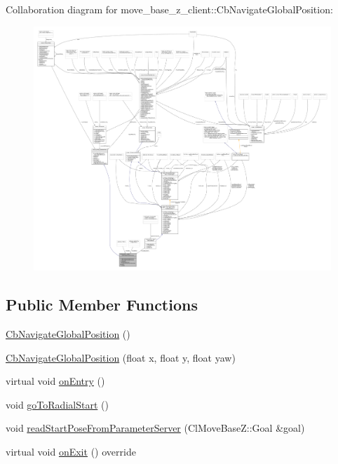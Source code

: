 Collaboration diagram for move\+\_\+base\+\_\+z\+\_\+client\+:\+:Cb\+Navigate\+Global\+Position\+:
\nopagebreak
\begin{figure}[H]
\begin{center}
\leavevmode
\includegraphics[width=350pt]{classmove__base__z__client_1_1CbNavigateGlobalPosition__coll__graph}
\end{center}
\end{figure}
\subsection*{Public Member Functions}
\begin{DoxyCompactItemize}
\item 
\hyperlink{classmove__base__z__client_1_1CbNavigateGlobalPosition_a3aec938912c0df9798bb18d5bb86c628}{Cb\+Navigate\+Global\+Position} ()
\item 
\hyperlink{classmove__base__z__client_1_1CbNavigateGlobalPosition_a4270b60a6d8ea39810ef1133f4e2cae4}{Cb\+Navigate\+Global\+Position} (float x, float y, float yaw)
\item 
virtual void \hyperlink{classmove__base__z__client_1_1CbNavigateGlobalPosition_aa91be9e16bb3b67560e97c8d29c384e4}{on\+Entry} ()
\item 
void \hyperlink{classmove__base__z__client_1_1CbNavigateGlobalPosition_abc8b9437cce7b86ec7acb07c463c90e5}{go\+To\+Radial\+Start} ()
\item 
void \hyperlink{classmove__base__z__client_1_1CbNavigateGlobalPosition_a866ea02c9e25ac1df9df88272deb04b3}{read\+Start\+Pose\+From\+Parameter\+Server} (Cl\+Move\+Base\+Z\+::\+Goal \&goal)
\item 
virtual void \hyperlink{classmove__base__z__client_1_1CbNavigateGlobalPosition_a99a2669387427f71a316e08db3bbcc00}{on\+Exit} () override
\end{DoxyCompactItemize}
